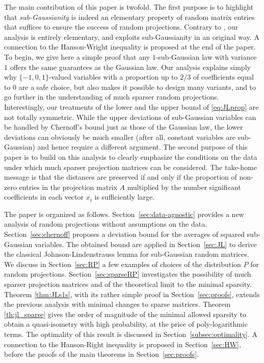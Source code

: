 \documentclass{ps}
\newcommand{\1}{\mathbbm{1}}
\theoremstyle{plain}
\begin{document}
 The main contribution of this paper is twofold. 
 The first purpose is to highlight that \emph{sub-Gaussianity} is indeed an elementary property of random matrix entries that suffices to ensure the success of random projections. Contrary to \cite{simpleJL24}, our analysis is entirely elementary, and exploits sub-Gaussianity in an original way. A connection to the Hanson-Wright inequality is  proposed at the end of the paper. To begin, we give here a simple proof that any $1$-sub-Gaussian law with variance $1$ offers the same guarantees as the Gaussian law. Our analysis explains simply why $\{-1, 0, 1\}$-valued variables with a proportion up to $2/3$ of coefficients equal to $0$ are a safe choice, but also makes it possible to design many variants, and to go further in the understanding of much sparser random projections. 
Interestingly, our treatments of the lower and the upper bound of \eqref{eq:JLprop} are not totally symmetric. While the upper deviations of sub-Gaussian variables can be handled by Chernoff's bound just as those of the Gaussian law, the lower deviations can obviously be much smaller (after all, constant variables are sub-Gaussian) and hence require a different argument.
The second purpose of this paper is to build on this analysis to clearly emphasize the conditions on the data under which much sparser projection matrices can be considered. The take-home message is that the distances are preserved if and only if the proportion of non-zero entries in the projection matrix $A$ multiplied by the number significant coefficients in each vector $x_i$ is sufficiently large.

The paper is organized as follows. Section~\ref{sec:data-agnostic} provides a new analysis of random projections without assumptions on the data. Section~\ref{sec:chernoff} proposes a deviation bound for the averages of squared sub-Gaussian variables. The obtained bound are applied in Section~\ref{sec:JL} to derive the classical Johnson-Lindenstrauss lemma for sub-Gaussian random matrices. We discuss in Section~\ref{sec:RP} a few examples of choices of the distribution $P$ for random projections. 
Section~\ref{sec:sparseRP} investigates the possibility of much sparser projection matrices and of the theoretical limit to the minimal sparsity. Theorem \ref{thm:JLs1s}, with its rather simple proof in Section~\ref{sec:proofs}, extends the previous analysis with minimal changes to sparse matrices. Theorem \ref{th:jl_sparse} gives the order of magnitude of the minimal allowed sparsity to obtain a quasi-isometry with high probability, at the price of poly-logarithmic terms. The optimality of this result is discussed in Section~\ref{subsec:optimality}. A connection to the Hanson-Right inequality is proposed in Section~\ref{sec:HW}, before the proofs of the main theorems in Section~\ref{sec:proofs}.
\end{document}
